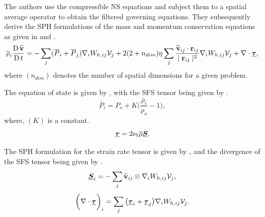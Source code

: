 The authors use the compressible NS equations and subject them to a spatial average operator to obtain the filtered governing equations. They subsequently derive the SPH formulations of the mass and momentum conservation equations as given in  and .
\begin{equation}
    \overline{\rho}_i\frac{\operatorname{D} \widetilde{\mathbf{v}}}{\operatorname{D} t} = - \sum_j (\overline{P}_i + \overline{P}_j) \nabla_{i} W_{h, ij} \mathcal{V}_j + 2(2+n_{dim})\eta \sum_j \frac{\widetilde{\mathbf{v}}_{ij} \cdot \mathbf{r}_{ij}}{\mid \mathbf{r}_{ij} \mid^{2}}\nabla_{i} W_{h, ij} \mathcal{V}_j + \nabla \cdot \underline{\bm{\tau}},
    \label{eq:Okraschevski2022-mom-sph}
\end{equation}
where $(n_{dim})$ denotes the number of spatial dimensions for a given problem.

The equation of state is given by , with the SFS tensor being given by .
\begin{equation}
    \overline{P}_i = P_o + K\bigg(\frac{\overline{\rho}_i}{\rho_o} - 1 \bigg),
    \label{eq:Okraschevski2022-eos-sph}
\end{equation}
where, $(K)$ is a constant.
\begin{equation}
    \underline{\bm{\tau}} = 2\nu_t\overline{\rho}\underline{\bm{S}}.
    \label{eq:Okraschevski2022-tau}
\end{equation}

The SPH formulation for the strain rate tensor is given by , and the divergence of the SFS tensor being given by .
\begin{equation}
    \underline{\bm{S}}_i = - \sum_j \widetilde{\mathbf{v}}_{ij} \otimes \nabla_{i} W_{h, ij} \mathcal{V}_j,
    \label{eq:Okraschevski2022-S-tensor-sph}
\end{equation}
\begin{equation}
    \bigg(\nabla \cdot \underline{\bm{\tau}}\bigg)_i =\sum_j \big( \underline{\bm{\tau}}_i + \underline{\bm{\tau}}_j \big) \nabla_{i} W_{h, ij} \mathcal{V}_j.
    \label{eq:Okraschevski2022-div-tau-sph}
\end{equation}

